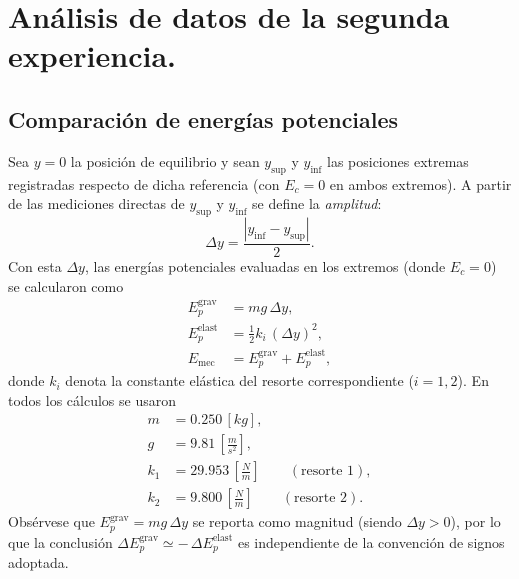\documentclass[11pt,twocolumn]{article}
\begin{document}

\section{Análisis de datos de la segunda experiencia.}
\label{sec:_analisis_segunda_experiencia}

\subsection{Comparación de energías potenciales}

Sea $y = 0$ la posición de equilibrio y sean $y_{\text{sup}}$ y $y_{\text{inf}}$ las posiciones extremas registradas respecto de dicha referencia (con $E_c = 0$ en ambos extremos). A partir de las mediciones directas de $y_{\text{sup}}$ y $y_{\text{inf}}$ se define la \emph{amplitud}:
\begin{equation*}
\Delta y = \frac{|y_{\text{inf}} - y_{\text{sup}}|}{2}.
\end{equation*}
Con esta $\Delta y$, las energías potenciales evaluadas en los extremos (donde $E_c=0$) se calcularon como
\begin{align*}
E_p^{\text{grav}} &= m g \,\Delta y, \\[4pt]
E_p^{\text{elast}} &= \tfrac{1}{2}k_i\,(\Delta y)^2, \\[4pt]
E_{\text{mec}} &= E_p^{\text{grav}} + E_p^{\text{elast}},
\end{align*}
donde $k_i$ denota la constante elástica del resorte correspondiente ($i=1,2$). En todos los cálculos se usaron
\begin{align*}
    m&=0.250\, [kg],\\[6pt]  
    g&=9.81\, \left[\frac{m}{s^2}\right],\\[6pt] 
    k_1&=29.953\,\left[\frac{N}{m}\right] \qquad(\text{resorte 1}),\\[6pt]
    k_2&=9.800\, \left[\frac{N}{m}\right]\qquad (\text{resorte 2}).
\end{align*}
Obsérvese que $E_p^{\text{grav}}=mg\,\Delta y$ se reporta como magnitud (siendo $\Delta y>0$), por lo que la conclusión $\Delta E_p^{\text{grav}}\simeq -\,\Delta E_p^{\text{elast}}$ es independiente de la convención de signos adoptada.
\end{document}
